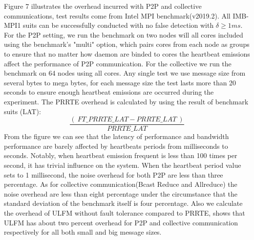 \documentclass[sigconf]{acmart}
\begin{document}
Figure 7 illustrates the overhead incurred with P2P and collective communications, test results come from Intel MPI benchmark(v2019.2). All IMB-MPI1 suits can be successfully conducted with no false detection with $ \delta \geq 1 ms $. For the P2P setting, we run the benchmark on two nodes will all cores included using the benchmark's "multi" option, which pairs cores from each node as groups to ensure that no matter how daemon are binded to cores the heartbeat emissions affect the performance of P2P communication. For the collective we run the benchmark on 64 nodes using all cores. Any single test we use message size from several bytes to mega bytes, for each message size the test lasts more than 20 seconds to ensure enough heartbeat emissions are occurred during the experiment. The PRRTE overhead is calculated by using the result of benchmark suits (LAT): 
\begin{equation}
\frac{(\ {FT\_PRRTE\_LAT - PRRTE\_LAT}\ )}{PRRTE\_LAT} 
\end{equation}
 From the figure we can see that the latency of performance and bandwidth performance are barely affected by heartbeats periods from milliseconds to seconds. Notably, when heartbeat emission frequent is less than 100 times per second, it has trivial influence on the system. When the heartbeat period value sets to 1 millisecond, the noise overhead for both P2P are less than three percentage. As for collective communication(Bcast Reduce and Allreduce) the noise overhead are less than eight percentage under the circumstance that the standard deviation of the benchmark itself is four percentage. Also we calculate the overhead of ULFM without fault tolerance compared to PRRTE, shows that ULFM has about two percent overhead for P2P and collective communication respectively for all both small and big message sizes.
\end{document}
